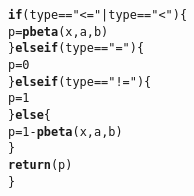 \documentclass{article}\usepackage[]{graphicx}\usepackage[]{xcolor}
\makeatletter
\newcommand{\hlnum}[1]{\textcolor[rgb]{0.686,0.059,0.569}{#1}}%
\newcommand{\hlsng}[1]{\textcolor[rgb]{0.192,0.494,0.8}{#1}}%
\newcommand{\hlopt}[1]{\textcolor[rgb]{0,0,0}{#1}}%
\newcommand{\hldef}[1]{\textcolor[rgb]{0.345,0.345,0.345}{#1}}%
\newcommand{\hlkwa}[1]{\textcolor[rgb]{0.161,0.373,0.58}{\textbf{#1}}}%
\newcommand{\hlkwb}[1]{\textcolor[rgb]{0.69,0.353,0.396}{#1}}%
\newcommand{\hlkwd}[1]{\textcolor[rgb]{0.737,0.353,0.396}{\textbf{#1}}}%
\newenvironment{kframe}{%
 \def\at@end@of@kframe{}%
 \ifinner\ifhmode%
  \def\at@end@of@kframe{\end{minipage}}%
  \begin{minipage}{\columnwidth}%
 \fi\fi%
 \def\FrameCommand##1{\hskip\@totalleftmargin \hskip-\fboxsep
 \colorbox{shadecolor}{##1}\hskip-\fboxsep
     \hskip-\linewidth \hskip-\@totalleftmargin \hskip\columnwidth}%
 \MakeFramed {\advance\hsize-\width
   \@totalleftmargin\z@ \linewidth\hsize
   \@setminipage}}%
 {\par\unskip\endMakeFramed%
 \at@end@of@kframe}
\newenvironment{knitrout}{}{} %
\makeatother
\begin{document}
\begin{enumerate}
\begin{knitrout}
\begin{kframe}
\begin{alltt}
  \hlkwa{if} \hldef{(type} \hlopt{==} \hlsng{"<="} \hlopt{|} \hldef{type} \hlopt{==} \hlsng{"<"}\hldef{) \{}
    \hldef{p} \hlkwb{=} \hlkwd{pbeta}\hldef{(x, a, b)}
  \hldef{\}}\hlkwa{else if} \hldef{(type} \hlopt{==} \hlsng{"="}\hldef{) \{}
    \hldef{p} \hlkwb{=} \hlnum{0}
  \hldef{\}}\hlkwa{else if} \hldef{(type} \hlopt{==} \hlsng{"!="}\hldef{) \{}
    \hldef{p} \hlkwb{=} \hlnum{1}
  \hldef{\}}\hlkwa{else} \hldef{\{}
    \hldef{p} \hlkwb{=} \hlnum{1} \hlopt{-} \hlkwd{pbeta}\hldef{(x, a, b)}
  \hldef{\}}
  \hlkwd{return}\hldef{(p)}
\hldef{\}}
\end{alltt}
\end{kframe}
\end{knitrout}
\end{enumerate}

\end{document}
